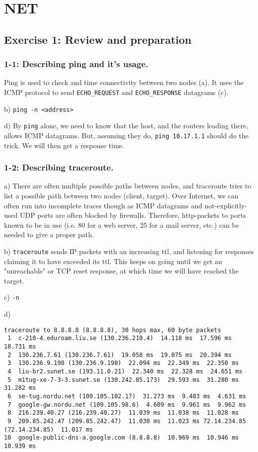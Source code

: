 
\chapter{NET}
\section{Exercise 1: Review and preparation}
\subsection{1-1: Describing ping and it's usage.}
Ping is used to check and time connectivity between two nodes (a). It uses the ICMP protocol to send \verb=ECHO_REQUEST= and \verb=ECHO_RESPONSE= datagrams (c).

b) \verb=ping -n <address>=

d) By \verb=ping= alone, we need to know that the host, and the routers leading there, allows ICMP datagrams. But, assuming they do,
\verb=ping 10.17.1.1= should do the trick. We will then get a response time.

\subsection{1-2: Describing traceroute.}
a) There are often multiple possible paths between nodes, and traceroute tries to list a possible path between two nodes (client, target). Over Internet, we can often run into incomplete traces though as ICMP datagrams and not-explicitly-used UDP ports are often blocked by firewalls. Therefore, http-packets to ports known to be in use (i.e. 80 for a web server, 25 for a mail server, etc.) can be needed to give a proper path.

b) \verb=traceroute= sends IP packets with an increasing ttl, and listening for responses claiming it to have exceeded its ttl. This keeps on going until we get an "unreachable" or TCP reset response, at which time we will have reached the target.

c) \verb=-n=

d) \begin{verbatim}traceroute to 8.8.8.8 (8.8.8.8), 30 hops max, 60 byte packets
 1  c-210-4.eduroam.liu.se (130.236.210.4)  14.118 ms  17.596 ms  18.731 ms
 2  130.236.7.61 (130.236.7.61)  19.058 ms  19.075 ms  20.394 ms
 3  130.236.9.198 (130.236.9.198)  22.094 ms  22.349 ms  22.350 ms
 4  liu-br2.sunet.se (193.11.0.21)  22.340 ms  22.328 ms  24.651 ms
 5  m1tug-xe-7-3-3.sunet.se (130.242.85.173)  29.593 ms  31.280 ms  31.282 ms
 6  se-tug.nordu.net (109.105.102.17)  31.273 ms  9.483 ms  4.631 ms
 7  google-gw.nordu.net (109.105.98.6)  4.609 ms  9.961 ms  9.962 ms
 8  216.239.40.27 (216.239.40.27)  11.039 ms  11.038 ms  11.028 ms
 9  209.85.242.47 (209.85.242.47)  11.030 ms  11.023 ms 72.14.234.85 (72.14.234.85)  11.017 ms
10  google-public-dns-a.google.com (8.8.8.8)  10.969 ms  10.946 ms  10.939 ms
\end{verbatim}

